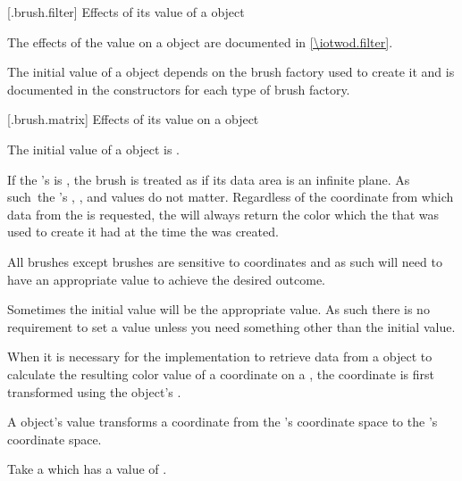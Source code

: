 %
 [\iotwod.brush.filter] {Effects of its  value of a  object}

\pnum
The effects of the  value on a  object are documented in \ref{\iotwod.filter}.

\pnum
The initial  value of a  object depends on the brush factory used to create it and is documented in the  constructors for each type of brush factory.

 [\iotwod.brush.matrix] {Effects of its  value on a  object}

\pnum
The initial  value of a  object is .

\pnum
If the 's  is , the brush is treated as if its data area is an infinite plane. As such\ the 's , , and  values do not matter. Regardless of the coordinate from which data from the  is requested, the  will always return the color which the  that was used to create it had at the time the  was created.

\pnum
All brushes except  brushes are sensitive to coordinates and as such will need to have an appropriate  value to achieve the desired outcome.

\pnum
\enternote
Sometimes the initial  value will be the appropriate value. As such there is no requirement to set a  value unless you need something other than the initial value.
\exitnote

\pnum
When it is necessary for the implementation to retrieve data from a  object to calculate the resulting color value of a coordinate on a , the coordinate is first transformed using the  object's .

\pnum
A  object's  value transforms a coordinate from the 's coordinate space to the 's coordinate space.

\pnum
\enterexample
Take a  which has a  value of .

